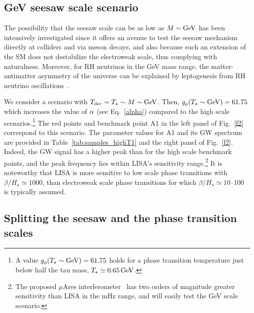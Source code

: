 \documentclass[a4paper,11pt]{article}
\begin{document}
\subsection{GeV seesaw scale scenario}  

The possibility that the seesaw scale can be as low as $M \sim {\rm GeV}$ has been intensively investigated since it offers an avenue to test the seesaw mechanism directly at colliders and via meson decays, and also because such an extension of the SM does not destabilize
the electroweak scale, thus complying with naturalness. Moreover, for RH neutrinos in the GeV mass range, the matter-antimatter asymmetry of the universe can be explained by leptogenesis from RH neutrino oscillations~\cite{Akhmedov:1998qx}. 

We consider a scenario  with $T_{\rm dec} = T_{\star}\sim M \sim  {\rm GeV}$. 
Then, $g_{\rho}(T_\star \sim {\rm GeV}) = 61.75$ which increases the value of $\alpha$  (see Eq.~\ref{alpha}) compared to the
high scale scenarios.\footnote{A value $g_{\rho}(T_\star \sim {\rm GeV}) = 61.75$ holds
for a phase transition temperature just below half the tau mass, $T_\star \simeq 0.65 \, {\rm GeV}$.} 
The red points and benchmark point A1 in the left panel of Fig.~\ref{f2}  correspond to this scenario.  The parameter values for A1 and its GW spectrum are provided in Table~\ref{tab:samples_highT1} and the right panel of Fig.~\ref{f2}. 
Indeed, the GW signal has a higher peak than for the high scale benchmark points,
and the peak frequency lies within LISA's sensitivity range.\footnote{The proposed $\mu$Ares interferometer~\cite{Sesana:2019vho} has two orders of magnitude greater sensitivity than LISA in the mHz range, and will easily test the GeV scale scenario.} 
It is noteworthy that LISA is more sensitive to low scale phase transitions
with $\beta/H_\star \simeq 1000$,  than  electroweak scale phase transitions for which
$\beta/H_\star \simeq 10$--100 is typically assumed.


\subsection{Splitting the seesaw and the phase transition scales} 
\end{document}
